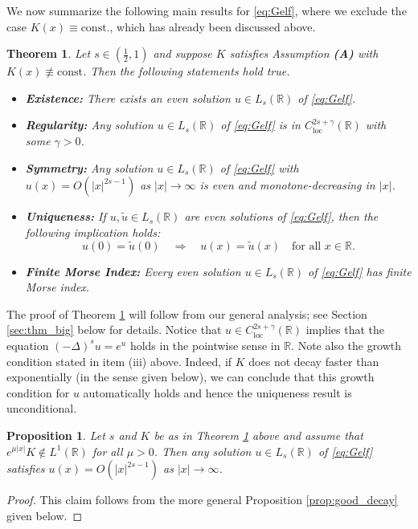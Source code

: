 \documentclass[reqno,10pt,a4paper]{amsart}
\newtheorem{prop}{Proposition}[section]
\newtheorem{thm}{Theorem}[section]
\theoremstyle{definition}
\theoremstyle{definition}
\theoremstyle{remark}
\theoremstyle{remark}
\numberwithin{equation}{section}
\newcommand{\R}{\mathbb{R}}
\newcommand{\Ds}{(-\Delta)^{s}}
\newcommand{\Cloc}{C_{\mathrm{loc}}}
\begin{document}
We now summarize the following main results for \eqref{eq:Gelf}, where we exclude the case $K(x) \equiv \mbox{const}.$, which has already been  discussed above.
 
\begin{thm} \label{thm:big}
Let $s \in (\frac 1 2, 1)$ and suppose $K$ satisfies Assumption {\em \textbf{(A)}} with $K(x) \not \equiv \mathrm{const}$. Then the following statements hold true.

\begin{itemize}
\item[(i)] \textbf{Existence:} There exists an even solution $u \in L_s(\R)$ of \eqref{eq:Gelf}.
\item[(ii)] \textbf{Regularity:} Any solution $u \in L_s(\R)$ of \eqref{eq:Gelf} is in $\Cloc^{2s+\gamma}(\R)$ with some $\gamma >0$. 
\item[(iii)] \textbf{Symmetry:} Any solution $u \in L_s(\R)$ of \eqref{eq:Gelf} with $u(x) = O(|x|^{2s-1})$ as $|x| \to \infty$ is even and monotone-decreasing in $|x|$. 
\item[(iv)]  \textbf{Uniqueness:}  If $u, \tilde{u} \in L_s(\R)$ are even solutions of \eqref{eq:Gelf}, then the following implication holds:
$$
u(0) = \tilde{u}(0) \quad \Rightarrow \quad u(x) = \tilde{u}(x) \quad \mbox{for all $x \in \R$}.
$$
\item[(v)] \textbf{Finite Morse Index:} Every even solution $u \in L_s(\R)$ of \eqref{eq:Gelf} has finite Morse index.
\end{itemize}
\end{thm}

The proof of Theorem \ref{thm:big} will follow from our general analysis; see Section \ref{sec:thm_big} below for details. Notice that $u \in \Cloc^{2s + \gamma}(\R)$ implies that the equation $\Ds u = e^u$ holds in the pointwise sense in $\R$. Note also the growth condition stated in item (iii) above. Indeed, if $K$ does not decay faster than exponentially (in the sense given below), we can conclude that this growth condition for $u$ automatically holds and hence the uniqueness result is unconditional.

\begin{prop} \label{prop:main1}
Let $s$ and $K$ be as in Theorem \ref{thm:big} above and assume that $e^{\mu |x|} K \not \in L^1(\R)$ for all $\mu > 0$. Then any solution $u \in L_s(\R)$ of \eqref{eq:Gelf} satisfies $u(x) = O(|x|^{2s-1})$ as $|x| \to \infty$.
\end{prop}  

\begin{proof}
This claim follows from the more general Proposition \ref{prop:good_decay} given below.
\end{proof}
 
\end{document}
